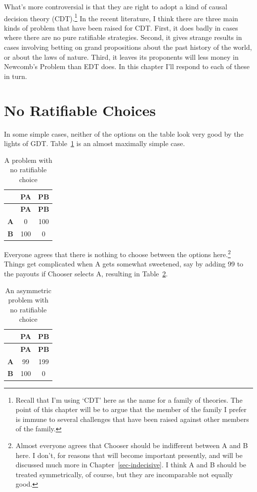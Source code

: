 \documentclass[
  12pt,
  letterpaper,
  DIV=11,
  numbers=noendperiod]{scrreprt}
\begin{document}
What's more controversial is that they are right to adopt a kind of
causal decision theory (CDT).\footnote{Recall that I'm using `CDT' here
  as the name for a family of theories. The point of this chapter will
  be to argue that the member of the family I prefer is immune to
  several challenges that have been raised against other members of the
  family.} In the recent literature, I think there are three main kinds
of problem that have been raised for CDT. First, it does badly in cases
where there are no pure ratifiable strategies. Second, it gives strange
results in cases involving betting on grand propositions about the past
history of the world, or about the laws of nature. Third, it leaves its
proponents will less money in Newcomb's Problem than EDT does. In this
chapter I'll respond to each of these in turn.

\section{No Ratifiable Choices}\label{sec-no-ratify}

In some simple cases, neither of the options on the table look very good
by the lights of GDT. Table~\ref{tbl-no-ratify-1} is an almost maximally
simple case.

\begin{longtable}[]{@{}ccc@{}}
\caption{A problem with no ratifiable
choice}\label{tbl-no-ratify-1}\tabularnewline
\toprule\noalign{}
& \textbf{PA} & \textbf{PB} \\
\midrule\noalign{}
\endfirsthead
\toprule\noalign{}
& \textbf{PA} & \textbf{PB} \\
\midrule\noalign{}
\endhead
\bottomrule\noalign{}
\endlastfoot
\textbf{A} & 0 & 100 \\
\textbf{B} & 100 & 0 \\
\end{longtable}

Everyone agrees that there is nothing to choose between the options
here.\footnote{Almost everyone agrees that Chooser should be indifferent
  between A and B here. I don't, for reasons that will become important
  presently, and will be discussed much more in
  Chapter~\ref{sec-indecisive}. I think A and B should be treated
  symmetrically, of course, but they are incomparable not equally good.}
Things get complicated when A gets somewhat sweetened, say by adding 99
to the payouts if Chooser selects A, resulting in
Table~\ref{tbl-no-ratify-2}.

\begin{longtable}[]{@{}ccc@{}}
\caption{An asymmetric problem with no ratifiable
choice}\label{tbl-no-ratify-2}\tabularnewline
\toprule\noalign{}
& \textbf{PA} & \textbf{PB} \\
\midrule\noalign{}
\endfirsthead
\toprule\noalign{}
& \textbf{PA} & \textbf{PB} \\
\midrule\noalign{}
\endhead
\bottomrule\noalign{}
\endlastfoot
\textbf{A} & 99 & 199 \\
\textbf{B} & 100 & 0 \\
\end{longtable}
\end{document}
